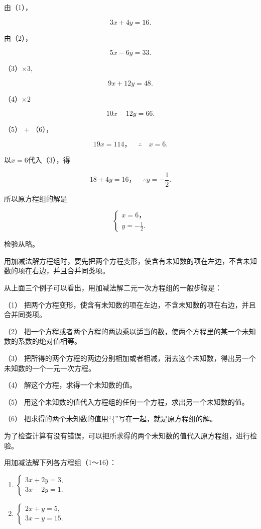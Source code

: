  由（1），

\[
3 x + 4 y = 16. \tag{3}
\]

由（2），

\[
5 x - 6 y = 33. \tag{4}
\]

（3）\(\times 3,\)

\[
9 x + 12 y = 48. \tag{5}
\]

（4）\(\times 2\)

\[
10 x - 12 y = 66. \tag{6}
\]

（5） + （6），

\[
19 x = 114\text{，} \quad \therefore \quad x = 6.
\]

以\(x = 6\)代入（3），得

\[
18 + 4 y = 16\text{，} \quad \therefore y = - \frac{1}{2}.
\]

所以原方程组的解是

\[
\left\{ \begin{array}{l} x = 6\text{，} \\ y = - \frac{1}{2}. \end{array} \right.
\]

检验从略。

用加减法解方程组时，要先把两个方程变形，使含有未知数的项在左边，不含未知数的项在右边，并且合并同类项。

从上面三个例子可以看出，用加减法解二元一次方程组的一般步骤是：

（1）
把两个方程变形，使含有未知数的项在左边，不含未知数的项在右边，并且合并同类项。

（2）
把一个方程或者两个方程的两边乘以适当的数，使两个方程里的某一个未知数的系数的绝对值相等。

（3）
把所得的两个方程的两边分别相加或者相减，消去这个未知数，得出另一个未知数的一个一元一次方程。

（4） 解这个方程，求得一个未知数的值。

（5） 用这个未知数的值代入方程组的任何一个方程，求出另一个未知数的值。

（6） 把求得的两个未知数的值用``\{''写在一起，就是原方程组的解。

为了检查计算有没有错误，可以把所求得的两个未知数的值代入原方程组，进行检验。

用加减法解下列各方程组（1～16）：

\begin{enumerate}[start=1]
\item
  \(\left\{ \begin{array}{l} 3x + 2y = 3, \\ 3x - 2y = 1. \end{array} \right.\)
\item
  \(\left\{ \begin{array}{l} 2x + y = 5, \\ 3x - y = 15. \end{array} \right.\)
\end{enumerate}


